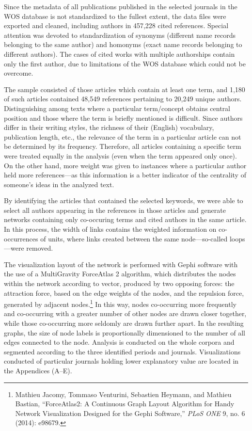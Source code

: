 \documentclass{tufte-handout}
\begin{document}
Since the metadata of all publications published in the selected
journals in the WOS database is not standardized to the fullest extent,
the data files were exported and cleaned, including authors in 457,228
cited references. Special attention was devoted to standardization of
synonyms (different name records belonging to the same author) and
homonyms (exact name records belonging to different authors). The cases
of cited works with multiple authorships contain only the first author,
due to limitations of the WOS database which could not be overcome.

The sample consisted of those articles which contain at least one term,
and 1,180 of such articles contained 48,549 references pertaining to
20,249 unique authors. Distinguishing among texts where a particular
term/concept obtains central position and those where the term is
briefly mentioned is difficult. Since authors differ in their writing
styles, the richness of their (English) vocabulary, publication length,
etc., the relevance of the term in a particular article can not be
determined by its frequency. Therefore, all articles containing a
specific term were treated equally in the analysis (even when the term
appeared only once). On the other hand, more weight was given to
instances where a particular author held more references---as this
information is a better indicator of the centrality of someone's ideas
in the analyzed text.

By identifying the articles that contained the selected keywords, we
were able to select all authors appearing in the references in those
articles and generate networks containing only co-occuring terms and
cited authors in the same article. In this process, the width of links
contains the weighted information on co-occurrences of units, where
links created between the same node---so-called loops---were removed.

The visualization layout of the network is performed with Gephi software
with the use of a MultiGravity ForceAtlas 2 algorithm, which distributes
the nodes within the network according to vector, produced by two
opposing forces: the attraction force, based on the edge weights of the
nodes, and the repulsion force, generated by adjacent nodes.\footnote{Mathieu
  Jacomy, Tommaso Venturini, Sebastien Heymann, and Mathieu Bastian,
  ``ForceAtlas2: A Continuous Graph Layout Algorithm for Handy Network
  Visualization Designed for the Gephi Software,'' \emph{PLoS ONE} 9,
  no. 6 (2014): e98679.} In this way, nodes co-occurring more frequently
and co-occurring with a greater number of other nodes are drawn closer
together, while those co-occurring more seldomly are drawn further
apart. In the resulting graphs, the size of node labels is
proportionally dimensioned to the number of all edges connected to the
node. Analysis is conducted on the whole corpora and segmented according
to the three identified periods and journals. Visualizations conducted
of particular journals holding lower explanatory value are located in
the Appendices (A--E).
\end{document}
